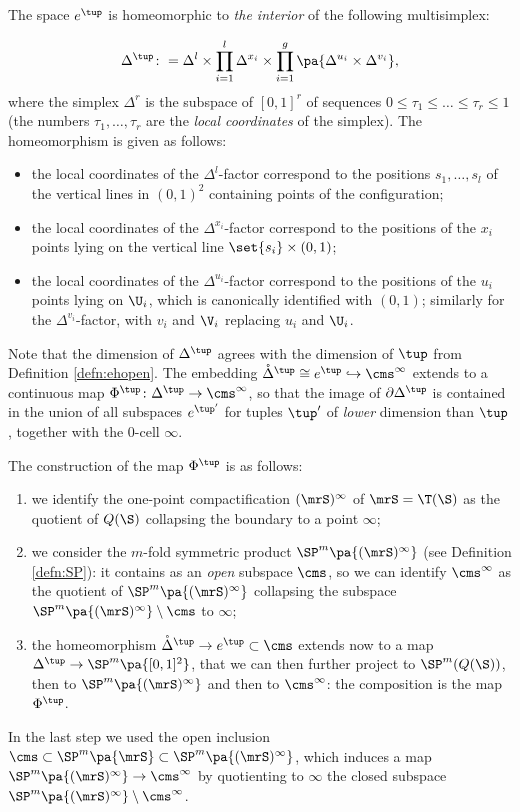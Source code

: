 The space $e^{\tup}$ is homeomorphic to \emph{the interior} of the following multisimplex:

\[
 \Delta^{\tup}\colon =
 \Delta^l\times\prod_{i=1}^l\Delta^{x_i}\times\prod_{i=1}^g\pa{\Delta^{u_i}\times\Delta^{v_i}},
\]
where the simplex $\Delta^r$ is the subspace of $[0,1]^r$ of sequences $0\leq \tau_1\leq\dots\leq\tau_r\leq 1$
(the numbers $\tau_1,\dots,\tau_r$ are the \emph{local coordinates} of the simplex). The homeomorphism is given
as follows:
\begin{itemize}
 \item the local coordinates of the $\Delta^l$-factor correspond to the positions $s_1,\dots,s_l$ of the vertical
 lines in $(0,1)^2$ containing points of the configuration;
 \item the local coordinates of the $\Delta^{x_i}$-factor correspond to the positions of the $x_i$ points
 lying on the vertical line $\set{s_i}\times(0,1)$;
 \item the local coordinates of the $\Delta^{u_i}$-factor correspond to the positions of the $u_i$ points
 lying on $\U_i$, which is canonically identified with $(0,1)$; similarly for the $\Delta^{v_i}$-factor,
 with $v_i$ and $\V_i$ replacing $u_i$ and $\U_i$.
\end{itemize}
Note that the dimension of $\Delta^{\tup}$ agrees with the dimension of $\tup$ from Definition \ref{defn:ehopen}.
The embedding $\mathring{\Delta}^{\tup}\cong e^{\tup}\hookrightarrow \cms^{\infty}$ extends to a continuous map
$\Phi^{\tup}\colon\Delta^{\tup}\to\cms^{\infty}$, so that the image of $\partial\Delta^{\tup}$ is contained in the union of
all subspaces $e^{\tup'}$ for tuples $\tup'$ of \emph{lower} dimension than $\tup$, together with the $0$-cell $\infty$.

The construction of the map $\Phi^{\tup}$ is as follows:
\begin{enumerate}
\item we identify the one-point compactification
$(\mrS)^{\infty}$ of $\mrS=\T(\S)$ as the quotient of $Q(\S)$ collapsing the boundary to a point $\infty$;
\item we consider the $m$-fold symmetric product $\SP^m\pa{(\mrS)^{\infty}}$ (see Definition \ref{defn:SP}): it contains 
as an \emph{open} subspace $\cms$, so we can identify $\cms^{\infty}$ as the quotient of $\SP^m\pa{(\mrS)^{\infty}}$ collapsing
the subspace $\SP^m\pa{(\mrS)^{\infty}}\setminus\cms$ to $\infty$;
\item the homeomorphism $\mathring{\Delta}^{\tup}\to e^{\tup}\subset\cms$ extends
now to a map $\Delta^{\tup}\to\SP^m\pa{[0,1]^2}$, that we can then further project to $\SP^m(Q(\S))$, then to
$ \SP^m\pa{(\mrS)^{\infty}}$ and then to $\cms^{\infty}$: the composition
is the map $\Phi^{\tup}$.
\end{enumerate}
In the last step we used the open inclusion $\cms\subset\SP^m\pa{\mrS}\subset\SP^m\pa{(\mrS)^{\infty}}$, which
induces a map $ \SP^m\pa{(\mrS)^{\infty}}\to\cms^{\infty}$ by quotienting to $\infty$ the closed subspace
$ \SP^m\pa{(\mrS)^{\infty}}\setminus \cms^{\infty}$.

